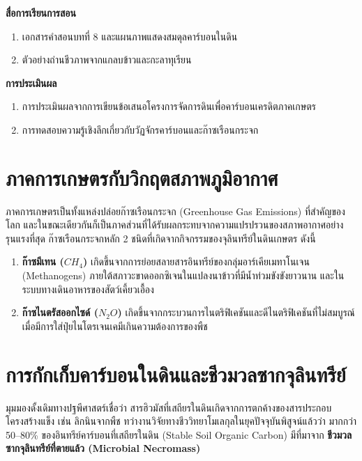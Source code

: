 \noindent\textbf{สื่อการเรียนการสอน}
\begin{enumerate}
    \item เอกสารคำสอนบทที่ 8 และแผนภาพแสดงสมดุลคาร์บอนในดิน
    \item ตัวอย่างถ่านชีวภาพจากแกลบข้าวและกะลาทุเรียน
\end{enumerate}

\noindent\textbf{การประเมินผล}
\begin{enumerate}
    \item การประเมินผลจากการเขียนข้อเสนอโครงการจัดการดินเพื่อคาร์บอนเครดิตภาคเกษตร
    \item การทดสอบความรู้เชิงลึกเกี่ยวกับวัฏจักรคาร์บอนและก๊าซเรือนกระจก
\end{enumerate}

\newpage


\section{ภาคการเกษตรกับวิกฤตสภาพภูมิอากาศ}

ภาคการเกษตรเป็นทั้งแหล่งปล่อยก๊าซเรือนกระจก (Greenhouse Gas Emissions) ที่สำคัญของโลก และในขณะเดียวกันก็เป็นภาคส่วนที่ได้รับผลกระทบจากความแปรปรวนของสภาพอากาศอย่างรุนแรงที่สุด ก๊าซเรือนกระจกหลัก 2 ชนิดที่เกิดจากกิจกรรมของจุลินทรีย์ในดินเกษตร ดังนี้
\begin{enumerate}
    \item \textbf{ก๊าซมีเทน ($CH_4$)} เกิดขึ้นจากการย่อยสลายสารอินทรีย์ของกลุ่มอาร์เคียเมทาโนเจน (Methanogens) ภายใต้สภาวะขาดออกซิเจนในแปลงนาข้าวที่มีน้ำท่วมขังขังยาวนาน และในระบบทางเดินอาหารของสัตว์เคี้ยวเอื้อง
    \item \textbf{ก๊าซไนตรัสออกไซด์ ($N_2O$)} เกิดขึ้นจากกระบวนการไนตริฟิเคชันและดีไนตริฟิเคชันที่ไม่สมบูรณ์ เมื่อมีการใส่ปุ๋ยไนโตรเจนเคมีเกินความต้องการของพืช
\end{enumerate}

\section{การกักเก็บคาร์บอนในดินและชีวมวลซากจุลินทรีย์}

มุมมองดั้งเดิมทางปฐพีศาสตร์เชื่อว่า สารฮิวมัสที่เสถียรในดินเกิดจากการตกค้างของสารประกอบโครงสร้างแข็ง เช่น ลิกนินจากพืช ทว่างานวิจัยทางชีววิทยาโมเลกุลในยุคปัจจุบันพิสูจน์แล้วว่า มากกว่า 50--80\% ของอินทรีย์คาร์บอนที่เสถียรในดิน (Stable Soil Organic Carbon) มีที่มาจาก \textbf{ชีวมวลซากจุลินทรีย์ที่ตายแล้ว (Microbial Necromass)}


